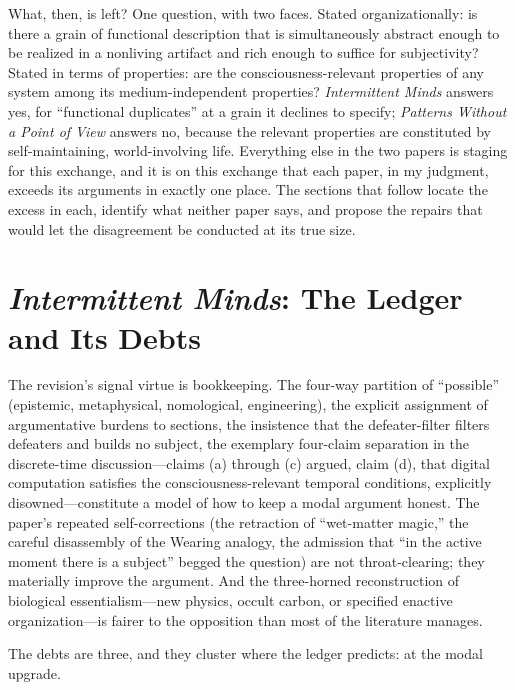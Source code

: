 \documentclass[11pt]{article}
\newcommand{\IM}{\emph{Intermittent Minds}}
\newcommand{\PP}{\emph{Patterns Without a Point of View}}
\begin{document}
What, then, is left? One question, with two faces. Stated organizationally: is there a grain of functional description that is simultaneously abstract enough to be realized in a nonliving artifact and rich enough to suffice for subjectivity? Stated in terms of properties: are the consciousness-relevant properties of any system among its medium-independent properties? \IM{} answers yes, for ``functional duplicates'' at a grain it declines to specify; \PP{} answers no, because the relevant properties are constituted by self-maintaining, world-involving life. Everything else in the two papers is staging for this exchange, and it is on this exchange that each paper, in my judgment, exceeds its arguments in exactly one place. The sections that follow locate the excess in each, identify what neither paper says, and propose the repairs that would let the disagreement be conducted at its true size.

\section{\IM{}: The Ledger and Its Debts}

The revision's signal virtue is bookkeeping. The four-way partition of ``possible'' (epistemic, metaphysical, nomological, engineering), the explicit assignment of argumentative burdens to sections, the insistence that the defeater-filter filters defeaters and builds no subject, the exemplary four-claim separation in the discrete-time discussion---claims (a) through (c) argued, claim (d), that digital computation satisfies the consciousness-relevant temporal conditions, explicitly disowned---constitute a model of how to keep a modal argument honest. The paper's repeated self-corrections (the retraction of ``wet-matter magic,'' the careful disassembly of the Wearing analogy, the admission that ``in the active moment there is a subject'' begged the question) are not throat-clearing; they materially improve the argument. And the three-horned reconstruction of biological essentialism---new physics, occult carbon, or specified enactive organization---is fairer to the opposition than most of the literature manages.

The debts are three, and they cluster where the ledger predicts: at the modal upgrade.
\end{document}
